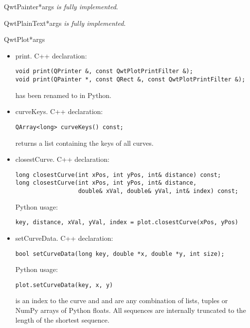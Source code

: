 \documentclass{manual}
\begin{document}
\begin{classdesc}{QwtPainter}{*args}
\emph{is fully implemented}.
\end{classdesc}

\begin{classdesc}{QwtPlainText}{*args}
\emph{is fully implemented}.
\end{classdesc}

\begin{classdesc}{QwtPlot}{*args}

  \begin{itemize}

    \item{print}. C++ declaration:
      \begin{verbatim}
void print(QPrinter &, const QwtPlotPrintFilter &);
void print(QPainter *, const QRect &, const QwtPlotPrintFilter &);
      \end{verbatim}
       has been renamed to  in Python.

    \item{curveKeys}. C++ declaration:
      \begin{verbatim}
QArray<long> curveKeys() const;
      \end{verbatim}
       returns a list containing the keys of all curves.

    \item{closestCurve}. C++ declaration:
      \begin{verbatim}
long closestCurve(int xPos, int yPos, int& distance) const;
long closestCurve(int xPos, int yPos, int& distance,
                  double& xVal, double& yVal, int& index) const;
      \end{verbatim}
      Python usage:
      \begin{verbatim}
key, distance, xVal, yVal, index = plot.closestCurve(xPos, yPos)
      \end{verbatim}

    \item{setCurveData}. C++ declaration:
      \begin{verbatim}
bool setCurveData(long key, double *x, double *y, int size);
      \end{verbatim}
      Python usage:
      \begin{verbatim}
plot.setCurveData(key, x, y)
      \end{verbatim}
       is an index to the curve and  and  are any
      combination of lists, tuples or NumPy arrays of Python floats.
      All sequences are internally truncated to the length of the shortest
      sequence.


\end{itemize}
\end{classdesc}
\end{document}
